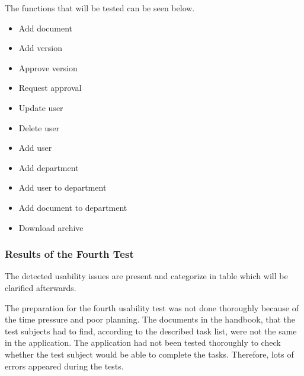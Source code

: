 \documentclass[../../master.tex]{subfiles}
\begin{document}
The functions that will be tested can be seen below.

\begin{itemize}
	\item Add document
	\item Add version
	\item Approve version
	\item Request approval
	\item Update user
	\item Delete user
	\item Add user
	\item Add department
	\item Add user to department
	\item Add document to department
	\item Download archive
\end{itemize}

\subsubsection*{Results of the Fourth Test}
The detected usability issues are present and categorize in table
 which will be clarified afterwards.

The preparation for the fourth usability test was not done thoroughly because of the time pressure and poor planning.
The documents in the handbook, that the test subjects had to find, according to the described task list, were not the same in the application.
The application had not been tested thoroughly to check whether the test subject would be able to complete the tasks.
Therefore, lots of errors appeared during the tests.
\end{document}
